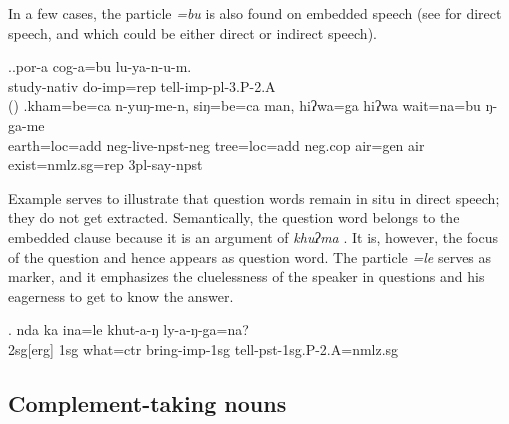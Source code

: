 In a few cases, the  particle \emph{=bu} is also found on embedded speech (see \Next[a] for direct speech, and \Next[b] which could be either direct or indirect speech). 

\ex.\ag.por-a        cog-a=bu         lu-ya-n-u-m.\\
study{\sc -nativ} do{\sc -imp=rep} tell{\sc -imp-pl-3.P-2.A}\\
 () 
\bg.kham=be=ca             n-yuŋ-me-n,                    siŋ=be=ca           man,     hiʔwa=ga    hiʔwa wait=na=bu            ŋ-ga-me\\
earth{\sc =loc=add} {\sc neg-}live{\sc [3sg]-npst-neg} tree{\sc =loc=add} {\sc neg.cop} air{\sc =gen} air exist{\sc [npst;3]=nmlz.sg=rep} {\sc 3pl-}say{\sc -npst}\\


Example \Next serves to illustrate that question words remain in situ in direct speech; they do not get extracted. Semantically, the question word belongs to the embedded clause because it is an argument of \emph{khuʔma} . It is, however, the focus of the question and hence appears as question word. The particle \emph{=le} serves as  marker, and it emphasizes the cluelessness of the speaker  in questions and his eagerness to get to know the answer.

\exg. nda ka ina=le khut-a-ŋ ly-a-ŋ-ga=na?\\
		{\sc 2sg[erg]} {\sc 1sg} what{\sc =ctr}	bring{\sc -imp-1sg} tell{\sc -pst-1sg.P-2.A=nmlz.sg}\\







\subsection{Complement-taking nouns}\label{noun-compl}

